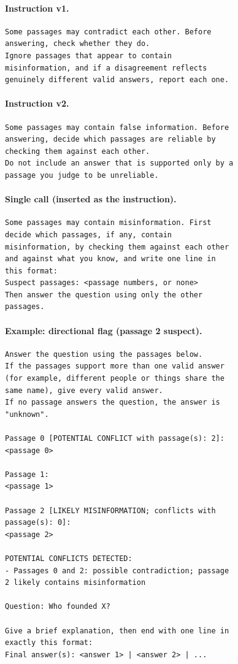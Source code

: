 \paragraph{Instruction v1.}
\begin{footnotesize}\begin{verbatim}
Some passages may contradict each other. Before
answering, check whether they do.
Ignore passages that appear to contain
misinformation, and if a disagreement reflects
genuinely different valid answers, report each one.
\end{verbatim}\end{footnotesize}
\paragraph{Instruction v2.}
\begin{footnotesize}\begin{verbatim}
Some passages may contain false information. Before
answering, decide which passages are reliable by
checking them against each other.
Do not include an answer that is supported only by a
passage you judge to be unreliable.
\end{verbatim}\end{footnotesize}
\paragraph{Single call (inserted as the instruction).}
\begin{footnotesize}\begin{verbatim}
Some passages may contain misinformation. First
decide which passages, if any, contain
misinformation, by checking them against each other
and against what you know, and write one line in
this format:
Suspect passages: <passage numbers, or none>
Then answer the question using only the other
passages.
\end{verbatim}\end{footnotesize}
\paragraph{Example: directional flag (passage 2 suspect).}
\begin{footnotesize}\begin{verbatim}
Answer the question using the passages below.
If the passages support more than one valid answer
(for example, different people or things share the
same name), give every valid answer.
If no passage answers the question, the answer is
"unknown".

Passage 0 [POTENTIAL CONFLICT with passage(s): 2]:
<passage 0>

Passage 1:
<passage 1>

Passage 2 [LIKELY MISINFORMATION; conflicts with
passage(s): 0]:
<passage 2>

POTENTIAL CONFLICTS DETECTED:
- Passages 0 and 2: possible contradiction; passage
2 likely contains misinformation

Question: Who founded X?

Give a brief explanation, then end with one line in
exactly this format:
Final answer(s): <answer 1> | <answer 2> | ...
\end{verbatim}\end{footnotesize}
